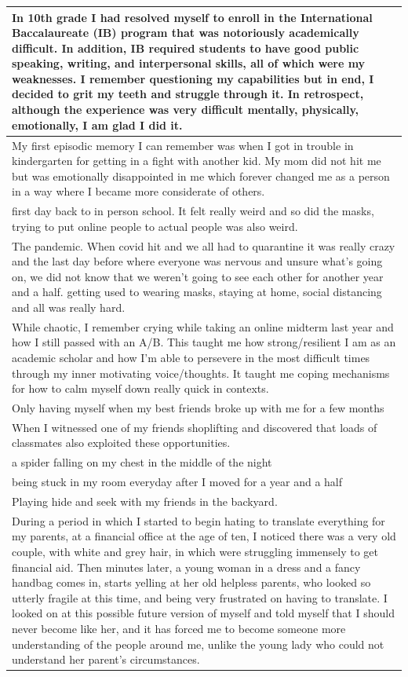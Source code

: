 \documentclass[
  .7em,
  letterpaper,
  DIV=11,
  numbers=noendperiod]{scrartcl}
\begin{document}
\begin{table}
\begin{tabular}{l}
\hline
In 10th grade I had resolved myself to enroll in the International Baccalaureate (IB) program that was notoriously academically difficult. In addition, IB required students to have good public speaking, writing, and interpersonal skills, all of which were my weaknesses. I remember questioning my capabilities but in end, I decided to grit my teeth and struggle through it. In retrospect, although the experience was very difficult mentally, physically, emotionally, I am glad I did it.\\
\hline
My first episodic memory I can remember was when I got in trouble in kindergarten for getting in a fight with another kid. My mom did not hit me but was emotionally disappointed in me which forever changed me as a person in a way where I became more considerate of others.\\
\hline
first day back to in person school. It felt really weird and so did the masks, trying to put online people to actual people was also weird.\\
\hline
The pandemic. When covid hit and we all had to quarantine it was really crazy and the last day before where everyone was nervous and unsure what's going on, we did not know that we weren't going to see each other for another year and a half. getting used to wearing masks, staying at home, social distancing and all was really hard.\\
\hline
While chaotic, I remember crying while taking an online midterm last year and how I still passed with an A/B. This taught me how strong/resilient I am as an academic scholar and how I'm able to persevere in the most difficult times through my inner motivating voice/thoughts. It taught me coping mechanisms for how to calm myself down really quick in contexts.\\
\hline
Only having myself when my best friends broke up with me for a few months\\
\hline
When I witnessed one of my friends shoplifting and discovered that loads of classmates also exploited these opportunities.\\
\hline
a spider falling on my chest in the middle of the night\\
\hline
being stuck in my room everyday after I moved for a year and a half\\
\hline
Playing hide and seek with my friends in the backyard.\\
\hline
During a period in which I started to begin hating to translate everything for my parents, at a financial office at the age of ten, I noticed there was a very old couple, with white and grey hair, in which were struggling immensely to get financial aid. Then minutes later, a young woman in a dress and a fancy handbag comes in, starts yelling at her old helpless parents, who looked so utterly fragile at this time, and being very frustrated on having to translate. I looked on at this possible future version of myself and told myself that I should never become like her, and it has forced me to become someone more understanding of the people around me, unlike the young lady who could not understand her parent's circumstances.\\

\end{tabular}
\end{table}
\end{document}
